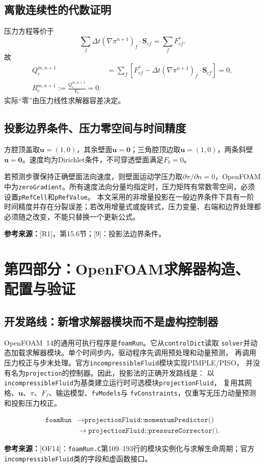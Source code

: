 \documentclass[UTF8,12pt,a4paper]{ctexart}
\numberwithin{equation}{section}
\newcommand{\dt}{\Delta t}
\newcommand{\Guermond}{\textnormal{[9]}}
\newcommand{\Rone}{\textnormal{[R1]}}
\newcommand{\OFfourteen}{\textnormal{[OF14]}}
\newcommand{\source}[1]{\par\smallskip\noindent\colorbox{sourcebg}{%
  \parbox{0.955\linewidth}{\footnotesize\color{sourcegray}\textbf{参考来源：}#1}}\par\smallskip}
\begin{document}
\subsection{离散连续性的代数证明}
压力方程等价于
\[
  \sum_f\dt(\nabla\pi^{n+1})_f\cdot\bm S_{cf}
  =\sum_fF_{cf}^*.
\]
故
\begin{align}
  Q_c^{m,n+1}
  &=\sum_f\left[F_{cf}^*
  -\dt(\nabla\pi^{n+1})_f\cdot\bm S_{cf}\right]=0,\\
  \boxed{R_c^{m,n+1}:=\frac{Q_c^{m,n+1}}{V_c}=0.}
  \label{eq:discrete_zero_div}
\end{align}
实际“零”由压力线性求解器容差决定。

\subsection{投影边界条件、压力零空间与时间精度}
方腔顶盖取$\bm u=(1,0)$，其余壁面$\bm u=\bm0$；三角腔顶边取$\bm u=(1,0)$，两条斜壁$\bm u=\bm0$。速度均为Dirichlet条件，不可穿透壁面满足$F_b=0$。

若预测步骤保持正确壁面法向速度，则壁面运动学压力取$\partial\pi/\partial n=0$，OpenFOAM中为\texttt{zeroGradient}。所有速度法向分量均指定时，压力矩阵有常数零空间，必须设置\texttt{pRefCell}和\texttt{pRefValue}。
本文采用的非增量投影在一般边界条件下具有一阶时间精度并存在分裂误差；若改用增量式或旋转式，压力变量、右端和边界处理都必须随之改变，不能只替换一个更新公式。
\source{\Rone，第15.6节；\Guermond：投影法边界条件。}

\section{第四部分：OpenFOAM求解器构造、配置与验证}
\subsection{开发路线：新增求解器模块而不是虚构控制器}
OpenFOAM~14的通用可执行程序是\texttt{foamRun}。它从\texttt{controlDict}读取
\texttt{solver}并动态加载求解器模块。单个时间步内，驱动程序先调用预处理和动量预测，
再调用压力校正与步末处理。官方\texttt{incompressibleFluid}模块实现PIMPLE/PISO，
并没有名为\texttt{projection}的控制器。因此，投影法的正确开发路线是：
以\texttt{incompressibleFluid}为基类建立运行时可选模块\texttt{projectionFluid}，
复用其网格、$\bm u$、$\pi$、$F_f$、输运模型、\texttt{fvModels}与
\texttt{fvConstraints}，仅重写无压力动量预测和投影压力校正。

\begin{equation}
  \boxed{\begin{aligned}
  \texttt{foamRun}&\longrightarrow
  \texttt{projectionFluid::momentumPredictor()}\\
  &\longrightarrow
  \texttt{projectionFluid::pressureCorrector()}.
  \end{aligned}}
  \label{eq:of14_lifecycle}
\end{equation}
\source{\OFfourteen：\texttt{foamRun.C}第109--193行的模块实例化与求解生命周期；官方
\texttt{incompressibleFluid}类的字段和虚函数接口。}
\end{document}
